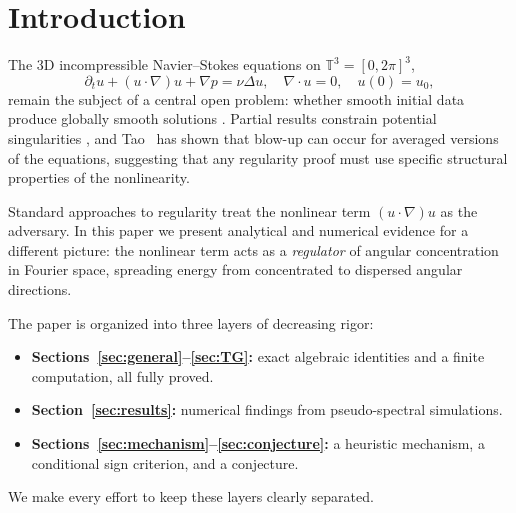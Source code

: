 \documentclass[11pt]{article}
\theoremstyle{definition}
\newcommand{\T}{\mathbb{T}}
\newcommand{\cC}{\mathcal{C}}
\begin{document}
\begin{abstract}
excursions $c^{(1)}>1$ do occur during cascade
development ($\max c=1.23$ at $\nu=0.005$) but
are confined and self-limiting; the proved results
establish spreading as the dominant regime.
We identify the alignment deviation
$D = (\sum(\cos^2\theta_i-1/3)^2)^{1/2}$
between vorticity and strain eigendirections
and prove $|\alpha| \leq |S|\,D$.
Numerical experiments falsify the conjectured
transfer inequality ($D$ vs.\ $\cC^{(1)}$) but
reveal the actual depletion mechanism:
\emph{eigenvalue selection}.  NS turbulence
aligns vorticity with the intermediate strain
eigenvector ($\cos^2\theta_2\to 0.55$), which
carries the smallest eigenvalue, depleting
$81\%$ of the potential stretching
($\alpha/|S|\approx 0.19$).  Under surgical
concentration, $\alpha/|S|\approx
0.14\sqrt{1-\cC^{(1)}}$: stretching efficiency
decreases monotonically with angular
concentration.
\end{abstract}

\tableofcontents
\newpage

\section{Introduction}

The 3D incompressible Navier--Stokes equations on
$\T^3 = [0,2\pi]^3$,
\begin{equation}\label{eq:NS}
\partial_t u + (u\cdot\nabla)u + \nabla p = \nu\Delta u,
\quad \nabla\cdot u = 0, \quad u(0) = u_0,
\end{equation}
remain the subject of a central open problem: whether
smooth initial data produce globally smooth solutions
\cite{Fefferman,Leray}.  Partial results constrain
potential singularities \cite{ESS,BKM}, and Tao~\cite{Tao}
has shown that blow-up can occur for averaged versions of
the equations, suggesting that any regularity proof must
use specific structural properties of the nonlinearity.

Standard approaches to regularity treat the nonlinear
term $(u\cdot\nabla)u$ as the adversary.  In this paper
we present analytical and numerical evidence for a
different picture: the nonlinear term acts as a
\emph{regulator} of angular concentration in Fourier
space, spreading energy from concentrated to dispersed
angular directions.

The paper is organized into three layers of decreasing
rigor:
\begin{itemize}[leftmargin=2em]
\item \textbf{Sections~\ref{sec:general}--\ref{sec:TG}:}
  exact algebraic identities and a finite computation,
  all fully proved.
\item \textbf{Section~\ref{sec:results}:} numerical
  findings from pseudo-spectral simulations.
\item \textbf{Sections~\ref{sec:mechanism}--\ref{sec:conjecture}:}
  a heuristic mechanism, a conditional sign criterion,
  and a conjecture.
\end{itemize}
We make every effort to keep these layers clearly
separated.
\end{document}
